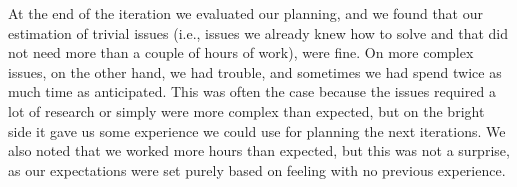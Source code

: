At the end of the iteration we evaluated our planning, and we found that our estimation of trivial issues (i.e., issues we already knew how to solve and that did not need more than a couple of hours of work), were fine. On more complex issues, on the other hand, we had trouble, and sometimes we had spend twice as much time as anticipated. This was often the case because the issues required a lot of research or simply were more complex than expected, but on the bright side it gave us some experience we could use for planning the next iterations. We also noted that we worked more hours than expected, but this was not a surprise, as our expectations were set purely based on feeling with no previous experience.



